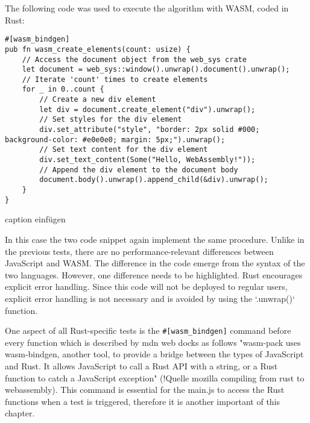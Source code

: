 The following code was used to execute the algorithm with WASM, coded in Rust:
\begin{verbatim}
#[wasm_bindgen]
pub fn wasm_create_elements(count: usize) {
    // Access the document object from the web_sys crate
    let document = web_sys::window().unwrap().document().unwrap();
    // Iterate 'count' times to create elements
    for _ in 0..count {
        // Create a new div element
        let div = document.create_element("div").unwrap();
        // Set styles for the div element
        div.set_attribute("style", "border: 2px solid #000; background-color: #e0e0e0; margin: 5px;").unwrap();
        // Set text content for the div element
        div.set_text_content(Some("Hello, WebAssembly!"));
        // Append the div element to the document body
        document.body().unwrap().append_child(&div).unwrap();
    }
}
\end{verbatim}
caption einfügen

In this case the two code snippet again implement the same procedure. Unlike in the previous tests, there are no performance-relevant differences between JavaScript and WASM. The difference in the code emerge from the syntax of the two languages. However, one difference needs to be highlighted. Rust encourages explicit error handling. Since this code will not be deployed to regular users, explicit error handling is not necessary and is avoided by using the `.unwrap()` function.

One aspect of all Rust-specific tests is the \texttt{\#[wasm\_bindgen]} command before every function which is described by mdn web docks as follows "wasm-pack uses wasm-bindgen, another tool, to provide a bridge between the types of JavaScript and Rust. It allows JavaScript to call a Rust API with a string, or a Rust function to catch a JavaScript exception" (!Quelle mozilla compiling from rust to webassembly). This command is essential for the main.js to access the Rust functions when a test is triggered, therefore it is another important of this chapter. 